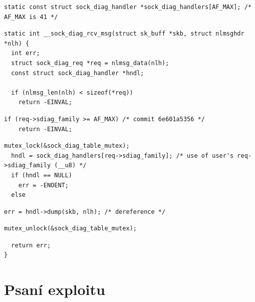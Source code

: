 \begin{frame}[fragile]{}

  \begin{lstlisting}[backgroundcolor=\only<2>{\color{mygray}}\only<3->{\color{white}},aboveskip=2pt,belowskip=0pt]
static const struct sock_diag_handler *sock_diag_handlers[AF_MAX]; /* AF_MAX is 41 */
  \end{lstlisting}
  \begin{lstlisting}
static int __sock_diag_rcv_msg(struct sk_buff *skb, struct nlmsghdr *nlh) {
  int err;
  struct sock_diag_req *req = nlmsg_data(nlh);
  const struct sock_diag_handler *hndl;

  if (nlmsg_len(nlh) < sizeof(*req))
    return -EINVAL;
  \end{lstlisting} %
  \begin{lstlisting}[backgroundcolor=\color{mygray}]
  if (req->sdiag_family >= AF_MAX) /* commit 6e601a5356 */
    return -EINVAL;
  \end{lstlisting}
  \begin{lstlisting}[belowskip=0pt,backgroundcolor=\only<2>{\color{mygray}}\only<3->{\color{white}}]
  mutex_lock(&sock_diag_table_mutex);
  hndl = sock_diag_handlers[req->sdiag_family]; /* use of user's req->sdiag_family (__u8) */
  if (hndl == NULL)
    err = -ENOENT;
  else
  \end{lstlisting}
  \begin{lstlisting}[aboveskip=0pt,belowskip=0pt,backgroundcolor=\only<3>{\color{mygray}}\only<4->{\color{white}}]
    err = hndl->dump(skb, nlh); /* dereference */
  \end{lstlisting}
  \begin{lstlisting}[aboveskip=0pt,belowskip=2pt,backgroundcolor=\only<2>{\color{mygray}}\only<3->{\color{white}}]
  mutex_unlock(&sock_diag_table_mutex);
  \end{lstlisting}
  \begin{lstlisting}
  return err;
}
  \end{lstlisting}

\end{frame}

\section{Psaní exploitu}
\frame{\sectionpage}

